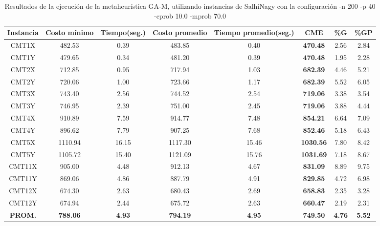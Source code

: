 \begin{table}[ht]
\caption{Resultados de la ejecución de la metaheurística GA-M, utilizando instancias de SalhiNagy con la configuración -n 200 -p 40 -cprob 10.0 -mprob 70.0}
\centering
\small
\begin{tabular}{c c c c c c c c}
\hline\hline
Instancia & Costo mínimo & Tiempo(seg.) & Costo promedio & Tiempo promedio(seg.) & CME & \%G & \%GP \\ [0.5ex]
\hline
CMT1X & 482.53 & 0.39 & 
483.85 & 0.40 & \bf{470.48} & 
2.56 & 2.84\\CMT1Y & 479.65 & 0.34 & 
481.20 & 0.39 & \bf{470.48} & 
1.95 & 2.28\\CMT2X & 712.85 & 0.95 & 
717.94 & 1.03 & \bf{682.39} & 
4.46 & 5.21\\CMT2Y & 720.06 & 1.00 & 
723.66 & 1.17 & \bf{682.39} & 
5.52 & 6.05\\CMT3X & 743.40 & 2.56 & 
744.52 & 2.54 & \bf{719.06} & 
3.38 & 3.54\\CMT3Y & 746.95 & 2.39 & 
751.00 & 2.45 & \bf{719.06} & 
3.88 & 4.44\\CMT4X & 910.89 & 7.59 & 
914.77 & 7.48 & \bf{854.21} & 
6.64 & 7.09\\CMT4Y & 896.62 & 7.79 & 
907.25 & 7.68 & \bf{852.46} & 
5.18 & 6.43\\CMT5X & 1110.94 & 16.15 & 
1117.30 & 15.46 & \bf{1030.56} & 
7.80 & 8.42\\CMT5Y & 1105.72 & 15.40 & 
1121.09 & 15.76 & \bf{1031.69} & 
7.18 & 8.67\\CMT11X & 905.00 & 4.48 & 
912.13 & 4.67 & \bf{831.09} & 
8.89 & 9.75\\CMT11Y & 869.06 & 4.86 & 
887.79 & 4.91 & \bf{829.85} & 
4.72 & 6.98\\CMT12X & 674.30 & 2.63 & 
680.43 & 2.69 & \bf{658.83} & 
2.35 & 3.28\\CMT12Y & 674.94 & 2.44 & 
675.72 & 2.63 & \bf{660.47} & 
2.19 & 2.31\\\bf{PROM.} & 
\bf{788.06} & \bf{4.93} & \bf{794.19} & \bf{4.95} & \bf{749.50} & \bf{4.76} & \bf{5.52}\\[1ex]\hline
\end{tabular}
\label{table:nonlin}
\end{table}

